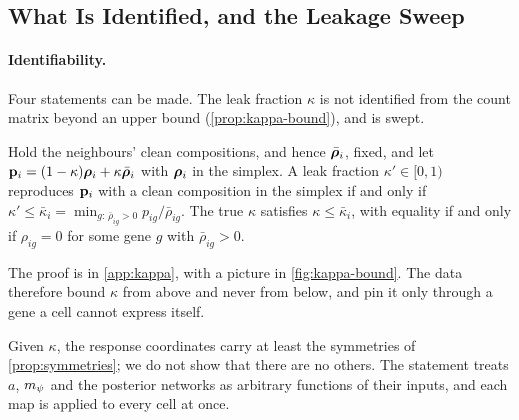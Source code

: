 \subsection{What Is Identified, and the Leakage Sweep}
\label{sec:sweep}

\paragraph{Identifiability.}
Four statements can be made. The leak fraction $\kappa$ is not identified from the count matrix beyond an upper bound (\cref{prop:kappa-bound}), and is swept.

\begin{proposition}\label{prop:kappa-bound}
Hold the neighbours' clean compositions, and hence $\bar{\boldsymbol{\rho}}_i$, fixed, and let $\mathbf{p}_i = (1-\kappa)\boldsymbol{\rho}_i + \kappa\bar{\boldsymbol{\rho}}_i$ with $\boldsymbol{\rho}_i$ in the simplex. A leak fraction $\kappa' \in [0, 1)$ reproduces $\mathbf{p}_i$ with a clean composition in the simplex if and only if $\kappa' \le \bar\kappa_i = \min_{g:\,\bar\rho_{ig} > 0} p_{ig}/\bar\rho_{ig}$. The true $\kappa$ satisfies $\kappa \le \bar\kappa_i$, with equality if and only if $\rho_{ig} = 0$ for some gene $g$ with $\bar\rho_{ig} > 0$.
\end{proposition}

\noindent The proof is in \cref{app:kappa}, with a picture in \cref{fig:kappa-bound}. The data therefore bound $\kappa$ from above and never from below, and pin it only through a gene a cell cannot express itself.

  Given $\kappa$, the response coordinates carry at least the symmetries of \cref{prop:symmetries}; we do not show that there are no others. The statement treats $a$, $m_{\psi}$ and the posterior networks as arbitrary functions of their inputs, and each map is applied to every cell at once.

